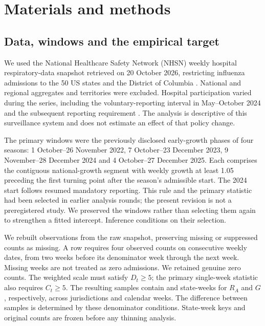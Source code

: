 \section{Materials and methods}
\label{sec:methods}

\subsection{Data, windows and the empirical target}
\label{sec:meth-data}

We used the National Healthcare Safety Network (NHSN) weekly hospital respiratory-data snapshot retrieved on 20 October 2026, restricting influenza admissions to the 50 US states and the District of Columbia \citep{cdc2026nhsn,frutos2025evaluation}. National and regional aggregates and territories were excluded. Hospital participation varied during the series, including the voluntary-reporting interval in May--October 2024 and the subsequent reporting requirement \citep{cms2024reporting}. The analysis is descriptive of this surveillance system and does not estimate an effect of that policy change.

The primary windows were the previously disclosed early-growth phases of four seasons: 1 October--26 November 2022, 7 October--23 December 2023, 9 November--28 December 2024 and 4 October--27 December 2025. Each comprises the contiguous national-growth segment with weekly growth at least 1.05 preceding the first turning point after the season's admissible start. The 2024 start follows resumed mandatory reporting. This rule and the primary statistic had been selected in earlier analysis rounds; the present revision is not a preregistered study. We preserved the windows rather than selecting them again to strengthen a fitted intercept. Inference conditions on their selection.

We rebuilt observations from the raw snapshot, preserving missing or suppressed counts as missing. A row requires four observed counts on consecutive weekly dates, from two weeks before its denominator week through the next week. Missing weeks are not treated as zero admissions. We retained genuine zero counts. The weighted scale must satisfy $D_t\ge5$; the primary single-week statistic also requires $C_t\ge5$. The resulting samples contain \Nra{} and \Ngs{} state-weeks for $R_A$ and $G$, respectively, across \Nstates{} jurisdictions and \Nweeks{} calendar weeks. The difference between samples is determined by these denominator conditions. State-week keys and original counts are frozen before any thinning analysis.

